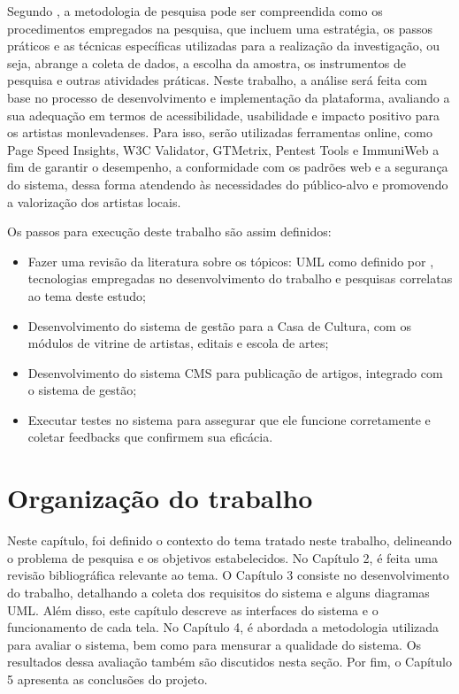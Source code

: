Segundo \cite{moresi2003metodologia}, a metodologia de pesquisa pode ser compreendida como os procedimentos empregados na pesquisa, que incluem uma estratégia, os passos práticos e as técnicas específicas utilizadas para a realização da investigação, ou seja, abrange a coleta de dados, a escolha da amostra, os instrumentos de pesquisa e outras atividades práticas. Neste trabalho, a análise será feita com base no processo de desenvolvimento e implementação da plataforma, avaliando a sua adequação em termos de acessibilidade, usabilidade e impacto positivo para os artistas monlevadenses. Para isso, serão utilizadas ferramentas online, como Page Speed Insights, W3C Validator, GTMetrix, Pentest Tools e ImmuniWeb a fim de garantir o desempenho, a conformidade com os padrões web e a segurança do sistema, dessa forma atendendo às necessidades do público-alvo e promovendo a valorização dos artistas locais.

Os passos para execução deste trabalho são assim definidos:

\begin{itemize}
	\item Fazer uma revisão da literatura sobre os tópicos: \ac{UML} como definido por , tecnologias empregadas no desenvolvimento do trabalho e pesquisas correlatas ao tema deste estudo;
	\item Desenvolvimento do sistema de gestão para a Casa de Cultura, com os módulos de vitrine de artistas, editais e escola de artes;
	\item Desenvolvimento do sistema \ac{CMS} para publicação de artigos, integrado com o sistema de gestão;
	\item Executar testes no sistema para assegurar que ele funcione corretamente e coletar feedbacks que confirmem sua eficácia.
\end{itemize}

\section{Organização do trabalho}

Neste capítulo, foi definido o contexto do tema tratado neste trabalho, delineando o problema de pesquisa e os objetivos estabelecidos. No Capítulo 2, é feita uma revisão bibliográfica relevante ao tema. O Capítulo 3 consiste no desenvolvimento do trabalho, detalhando a coleta dos requisitos do sistema e alguns diagramas \ac{UML}. Além disso, este capítulo descreve as interfaces do sistema e o funcionamento de cada tela. No Capítulo 4, é abordada a metodologia utilizada para avaliar o sistema, bem como para mensurar a qualidade do sistema. Os resultados dessa avaliação também são discutidos nesta seção. Por fim, o Capítulo 5 apresenta as conclusões do projeto.
